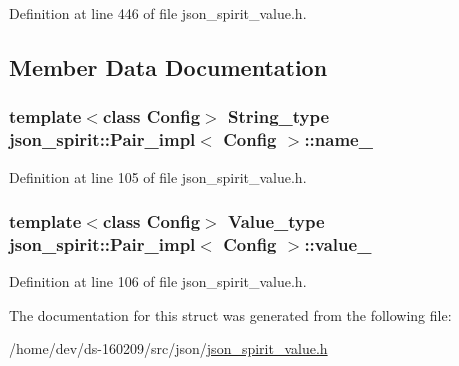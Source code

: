 Definition at line 446 of file json\+\_\+spirit\+\_\+value.\+h.



\subsection{Member Data Documentation}
\hypertarget{structjson__spirit_1_1_pair__impl_ac39e926ac119e19889bdc44958a707da}{}
\subsubsection[{name\+\_\+}]{\setlength{\rightskip}{0pt plus 5cm}template$<$class Config$>$ {\bf String\+\_\+type} {\bf json\+\_\+spirit\+::\+Pair\+\_\+impl}$<$ {\bf Config} $>$\+::name\+\_\+}\label{structjson__spirit_1_1_pair__impl_ac39e926ac119e19889bdc44958a707da}


Definition at line 105 of file json\+\_\+spirit\+\_\+value.\+h.

\hypertarget{structjson__spirit_1_1_pair__impl_aa669eda030541a05d8736db0839925e1}{}
\subsubsection[{value\+\_\+}]{\setlength{\rightskip}{0pt plus 5cm}template$<$class Config$>$ {\bf Value\+\_\+type} {\bf json\+\_\+spirit\+::\+Pair\+\_\+impl}$<$ {\bf Config} $>$\+::value\+\_\+}\label{structjson__spirit_1_1_pair__impl_aa669eda030541a05d8736db0839925e1}


Definition at line 106 of file json\+\_\+spirit\+\_\+value.\+h.



The documentation for this struct was generated from the following file\+:\begin{DoxyCompactItemize}
\item 
/home/dev/ds-\/160209/src/json/\hyperlink{json__spirit__value_8h}{json\+\_\+spirit\+\_\+value.\+h}\end{DoxyCompactItemize}

